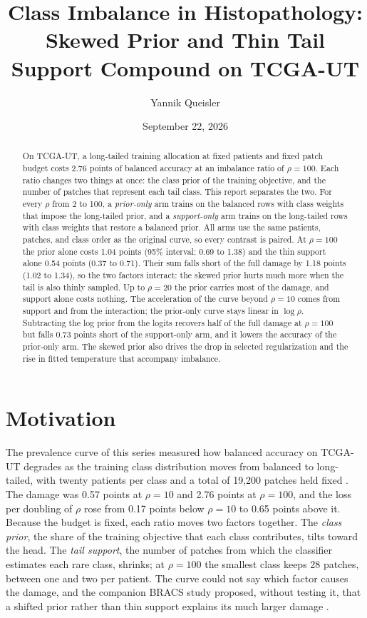 \documentclass[11pt]{article}
\title{Class Imbalance in Histopathology:\\Skewed Prior and Thin Tail Support Compound on TCGA-UT}
\author{Yannik Queisler}
\date{September 22, 2026}
\begin{document}
\raggedbottom
{}
\setlength{\emergencystretch}{2em}
\maketitle
\begin{abstract}
\noindent On TCGA-UT, a long-tailed training allocation at fixed patients and fixed patch budget costs 2.76 points of balanced accuracy at an imbalance ratio of $\rho=100$. Each ratio changes two things at once: the class prior of the training objective, and the number of patches that represent each tail class. This report separates the two. For every $\rho$ from 2 to 100, a \emph{prior-only} arm trains on the balanced rows with class weights that impose the long-tailed prior, and a \emph{support-only} arm trains on the long-tailed rows with class weights that restore a balanced prior. All arms use the same patients, patches, and class order as the original curve, so every contrast is paired. At $\rho=100$ the prior alone costs 1.04 points (95\% interval: 0.69 to 1.38) and the thin support alone 0.54 points (0.37 to 0.71). Their sum falls short of the full damage by 1.18 points (1.02 to 1.34), so the two factors interact: the skewed prior hurts much more when the tail is also thinly sampled. Up to $\rho=20$ the prior carries most of the damage, and support alone costs nothing. The acceleration of the curve beyond $\rho=10$ comes from support and from the interaction; the prior-only curve stays linear in $\log\rho$. Subtracting the log prior from the logits recovers half of the full damage at $\rho=100$ but falls 0.73 points short of the support-only arm, and it lowers the accuracy of the prior-only arm. The skewed prior also drives the drop in selected regularization and the rise in fitted temperature that accompany imbalance.
\end{abstract}

\section{Motivation}
\label{sec:motivation}
The prevalence curve of this series measured how balanced accuracy on TCGA-UT degrades as the training class distribution moves from balanced to long-tailed, with twenty patients per class and a total of 19,200 patches held fixed \citep{queisler2026prevalenceTcga}. The damage was 0.57 points at $\rho=10$ and 2.76 points at $\rho=100$, and the loss per doubling of $\rho$ rose from 0.17 points below $\rho=10$ to 0.65 points above it. Because the budget is fixed, each ratio moves two factors together. The \emph{class prior}, the share of the training objective that each class contributes, tilts toward the head. The \emph{tail support}, the number of patches from which the classifier estimates each rare class, shrinks; at $\rho=100$ the smallest class keeps 28 patches, between one and two per patient. The curve could not say which factor causes the damage, and the companion BRACS study proposed, without testing it, that a shifted prior rather than thin support explains its much larger damage \citep{queisler2026prevalenceBracs}.
\end{document}
